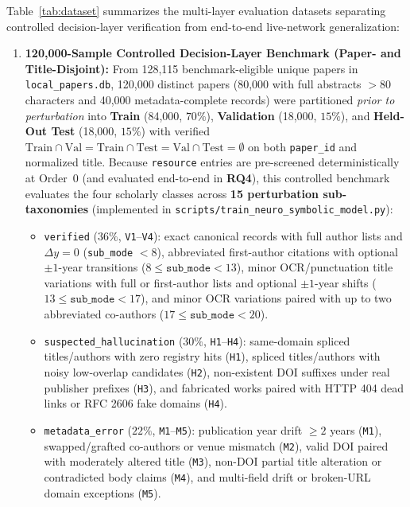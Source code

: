 Table~\ref{tab:dataset} summarizes the multi-layer evaluation datasets separating controlled decision-layer verification from end-to-end live-network generalization:
\begin{enumerate}
    \item \textbf{120,000-Sample Controlled Decision-Layer Benchmark (Paper- and Title-Disjoint):} From 128,115 benchmark-eligible unique papers in \texttt{local\_papers.db}, 120,000 distinct papers (80,000 with full abstracts $>80$ characters and 40,000 metadata-complete records) were partitioned \emph{prior to perturbation} into \textbf{Train} (84,000, $70\%$), \textbf{Validation} (18,000, $15\%$), and \textbf{Held-Out Test} (18,000, $15\%$) with verified $\text{Train} \cap \text{Val} = \text{Train} \cap \text{Test} = \text{Val} \cap \text{Test} = \emptyset$ on both \texttt{paper\_id} and normalized title. Because \texttt{resource} entries are pre-screened deterministically at Order~0 (and evaluated end-to-end in \textbf{RQ4}), this controlled benchmark evaluates the four scholarly classes across \textbf{15 perturbation sub-taxonomies} (implemented in \texttt{scripts/train\_neuro\_symbolic\_model.py}):
    \begin{itemize}
        \item \texttt{verified} ($36\%$, \texttt{V1}--\texttt{V4}): exact canonical records with full author lists and $\Delta y = 0$ (\texttt{sub\_mode} $< 8$), abbreviated first-author citations with optional $\pm 1$-year transitions ($8 \le \texttt{sub\_mode} < 13$), minor OCR/punctuation title variations with full or first-author lists and optional $\pm 1$-year shifts ($13 \le \texttt{sub\_mode} < 17$), and minor OCR variations paired with up to two abbreviated co-authors ($17 \le \texttt{sub\_mode} < 20$).
        \item \texttt{suspected\_hallucination} ($30\%$, \texttt{H1}--\texttt{H4}): same-domain spliced titles/authors with zero registry hits (\texttt{H1}), spliced titles/authors with noisy low-overlap candidates (\texttt{H2}), non-existent DOI suffixes under real publisher prefixes (\texttt{H3}), and fabricated works paired with HTTP 404 dead links or RFC 2606 fake domains (\texttt{H4}).
        \item \texttt{metadata\_error} ($22\%$, \texttt{M1}--\texttt{M5}): publication year drift $\ge 2$ years (\texttt{M1}), swapped/grafted co-authors or venue mismatch (\texttt{M2}), valid DOI paired with moderately altered title (\texttt{M3}), non-DOI partial title alteration or contradicted body claims (\texttt{M4}), and multi-field drift or broken-URL domain exceptions (\texttt{M5}).

\end{itemize}
\end{enumerate}
